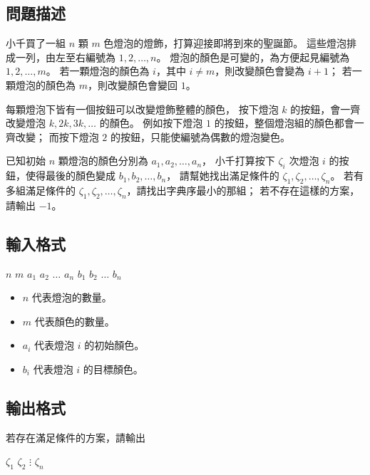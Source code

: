 \subsection{問題描述}

小千買了一組 \(n\) 顆 \(m\) 色燈泡的燈飾，打算迎接即將到來的聖誕節。
這些燈泡排成一列，由左至右編號為 \(1, 2, \ldots, n\)。
燈泡的顏色是可變的，為方便起見編號為 \(1, 2, \ldots, m\)。
若一顆燈泡的顏色為 \(i\)，其中 \(i \ne m\)，則改變顏色會變為 \(i+1\)；
若一顆燈泡的顏色為 \(m\)，則改變顏色會變回 \(1\)。

每顆燈泡下皆有一個按鈕可以改變燈飾整體的顏色， 按下燈泡 \(k\)
的按鈕，會一齊改變燈泡 \(k, 2k, 3k, \ldots\) 的顏色。 例如按下燈泡 \(1\)
的按鈕，整個燈泡組的顏色都會一齊改變； 而按下燈泡 \(2\)
的按鈕，只能使編號為偶數的燈泡變色。

已知初始 \(n\) 顆燈泡的顏色分別為 \(a_1, a_2, \ldots, a_n\)，
小千打算按下 \(\zeta_i\) 次燈泡 \(i\) 的按鈕，使得最後的顏色變成
\(b_1, b_2, \ldots, b_n\)， 請幫她找出滿足條件的
\(\zeta_1, \zeta_2, \ldots, \zeta_n\)。 若有多組滿足條件的
\(\zeta_1, \zeta_2, \ldots, \zeta_n\)，請找出字典序最小的那組；
若不存在這樣的方案，請輸出 \(-1\)。

\subsection{輸入格式}

\begin{format}
\f{
$n$ $m$
$a_1$ $a_2$ $\ldots$ $a_n$
$b_1$ $b_2$ $\ldots$ $b_n$
}
\end{format}

\begin{itemize}
\tightlist
\item
  \(n\) 代表燈泡的數量。
\item
  \(m\) 代表顏色的數量。
\item
  \(a_i\) 代表燈泡 \(i\) 的初始顏色。
\item
  \(b_i\) 代表燈泡 \(i\) 的目標顏色。
\end{itemize}

\subsection{輸出格式}

若存在滿足條件的方案，請輸出

\begin{format}
\f{
$\zeta_1$
$\zeta_2$
$\vdots$
$\zeta_n$
}
\end{format}

